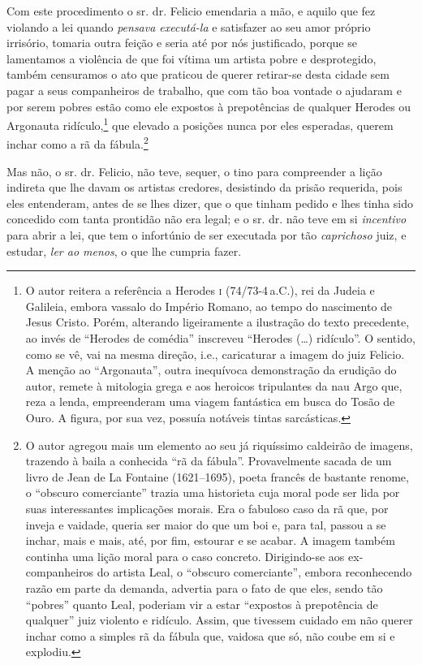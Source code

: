 Com este procedimento o sr. dr. Felicio emendaria a mão, e aquilo que
fez violando a lei quando \emph{pensava executá-la} e satisfazer ao seu
amor próprio irrisório, tomaria outra feição e seria até por nós
justificado, porque se lamentamos a violência de que foi vítima um
artista pobre e desprotegido, também censuramos o ato que praticou de
querer retirar-se desta cidade sem pagar a seus companheiros de
trabalho, que com tão boa vontade o ajudaram e por serem pobres estão
como ele expostos à prepotências de qualquer Herodes ou Argonauta
ridículo,\footnote{ O autor reitera a referência a Herodes \textsc{i} (74/73-4\,a.C.), 
rei da Judeia e Galileia, embora vassalo do Império
  Romano, ao tempo do nascimento de Jesus Cristo. Porém, alterando
  ligeiramente a ilustração do texto precedente, ao invés de ``Herodes de
  comédia'' inscreveu ``Herodes (\ldots{}) ridículo''. O sentido, como se vê,
  vai na mesma direção, i.e., caricaturar a imagem do juiz Felicio. A
  menção ao ``Argonauta'', outra inequívoca demonstração da erudição do
  autor, remete à mitologia grega e aos heroicos tripulantes da nau Argo
  que, reza a lenda, empreenderam uma viagem fantástica em busca do
  Tosão de Ouro. A figura, por sua vez, possuía notáveis tintas
  sarcásticas.} que elevado a posições nunca por eles esperadas, querem
inchar como a rã da fábula.\footnote{ O autor agregou mais um elemento
  ao seu já riquíssimo caldeirão de imagens, trazendo à baila a
  conhecida ``rã da fábula''. Provavelmente sacada de um livro de Jean de
  La Fontaine (1621--1695), poeta francês de bastante renome, o ``obscuro
  comerciante'' trazia uma historieta cuja moral pode ser lida por suas
  interessantes implicações morais. Era o fabuloso caso da rã que, por
  inveja e vaidade, queria ser maior do que um boi e, para tal, passou a
  se inchar, mais e mais, até, por fim, estourar e se acabar. A imagem
  também continha uma lição moral para o caso concreto. Dirigindo-se aos
  ex-companheiros do artista Leal, o ``obscuro comerciante'', embora
  reconhecendo razão em parte da demanda, advertia para o fato de que
  eles, sendo tão ``pobres'' quanto Leal, poderiam vir a estar ``expostos à
  prepotência de qualquer'' juiz violento e ridículo. Assim, que tivessem
  cuidado em não querer inchar como a simples rã da fábula que, vaidosa
  que só, não coube em si e explodiu.}

Mas não, o sr. dr. Felicio, não teve, sequer, o tino para compreender a
lição indireta que lhe davam os artistas credores, desistindo da prisão
requerida, pois eles entenderam, antes de se lhes dizer, que o que
tinham pedido e lhes tinha sido concedido com tanta prontidão não era
legal; e o sr. dr. não teve em si \emph{incentivo} para abrir a lei, que
tem o infortúnio de ser executada por tão \emph{caprichoso} juiz, e
estudar, \emph{ler ao menos}, o que lhe cumpria fazer.


